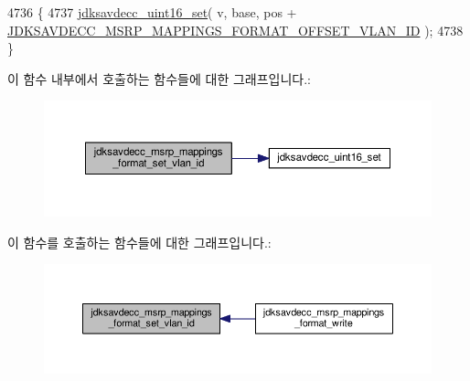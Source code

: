 \begin{DoxyCode}
4736 \{
4737     \hyperlink{group__endian_ga14b9eeadc05f94334096c127c955a60b}{jdksavdecc\_uint16\_set}( v, base, pos + 
      \hyperlink{group__msrp__mappings__format_gac89827632a3bb8e747f9c1d7b1be3faa}{JDKSAVDECC\_MSRP\_MAPPINGS\_FORMAT\_OFFSET\_VLAN\_ID} );
4738 \}
\end{DoxyCode}


이 함수 내부에서 호출하는 함수들에 대한 그래프입니다.\+:
\nopagebreak
\begin{figure}[H]
\begin{center}
\leavevmode
\includegraphics[width=350pt]{group__msrp__mappings__format_ga1152bffb44746ced7445236ca5aa5bf8_cgraph}
\end{center}
\end{figure}




이 함수를 호출하는 함수들에 대한 그래프입니다.\+:
\nopagebreak
\begin{figure}[H]
\begin{center}
\leavevmode
\includegraphics[width=350pt]{group__msrp__mappings__format_ga1152bffb44746ced7445236ca5aa5bf8_icgraph}
\end{center}
\end{figure}



